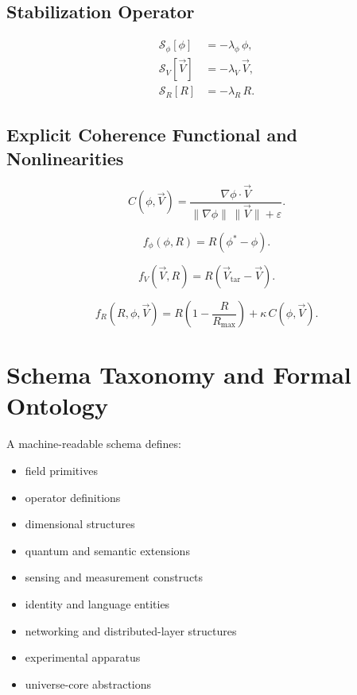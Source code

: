 \documentclass[12pt]{article}
\begin{document}
\subsection{Stabilization Operator}

\begin{align}
    \mathcal{S}_\phi[\phi] &= -\lambda_\phi\, \phi, \\
    \mathcal{S}_V[\vec{V}] &= -\lambda_V\, \vec{V}, \\
    \mathcal{S}_R[R] &= -\lambda_R\, R.
\end{align}

\subsection{Explicit Coherence Functional and Nonlinearities}

\begin{equation}
    C(\phi, \vec{V})
    = \frac{\nabla \phi \cdot \vec{V}}
           {\|\nabla \phi\|\,\|\vec{V}\| + \varepsilon}.
\end{equation}

\begin{equation}
    f_\phi(\phi, R)
    = R \left( \phi^\ast - \phi \right).
\end{equation}

\begin{equation}
    f_V(\vec{V}, R)
    = R \left( \vec{V}_\mathrm{tar} - \vec{V} \right).
\end{equation}

\begin{equation}
    f_R(R, \phi, \vec{V})
    = R \left( 1 - \frac{R}{R_{\max}} \right)
      + \kappa\, C(\phi, \vec{V}).
\end{equation}

\section{Schema Taxonomy and Formal Ontology}

A machine-readable schema defines:

\begin{itemize}
    \item field primitives
    \item operator definitions
    \item dimensional structures
    \item quantum and semantic extensions
    \item sensing and measurement constructs
    \item identity and language entities
    \item networking and distributed-layer structures
    \item experimental apparatus
    \item universe-core abstractions
\end{itemize}
\end{document}
